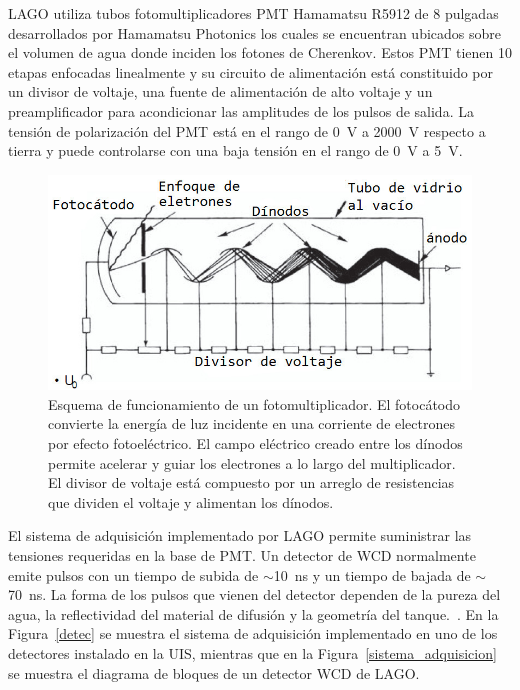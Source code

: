 LAGO utiliza tubos fotomultiplicadores PMT Hamamatsu R5912 de 8 pulgadas desarrollados por Hamamatsu Photonics los cuales se encuentran ubicados sobre el volumen de agua donde inciden los fotones de Cherenkov. 
Estos PMT tienen 10 etapas enfocadas linealmente y su circuito de alimentación está constituido por un divisor de voltaje, una fuente de alimentación de alto voltaje y un preamplificador para acondicionar las amplitudes de los pulsos de salida.
La tensión de polarización del PMT está en el rango de 0~V a 2000~V respecto a tierra y puede controlarse con una baja tensión en el rango de 0~V a 5~V.

\begin{figure}[H]
\includegraphics[scale=0.35]{Figs/pmtll.jpeg} 
\centering
\caption[Esquema de funcionamiento de un fotomultiplicador]{Esquema de funcionamiento de un fotomultiplicador.
El fotocátodo convierte la energía de luz incidente en una corriente de electrones por efecto fotoeléctrico.
El campo eléctrico creado entre los dínodos permite acelerar y guiar los electrones a lo largo del multiplicador.
El divisor de voltaje está compuesto por un arreglo de resistencias que dividen el voltaje y alimentan los dínodos.~\citep{hernandez2018procedimiento}}
\label{foto}
\end{figure}

El sistema de adquisición implementado por LAGO permite suministrar las tensiones requeridas en la base de PMT.
Un detector de WCD normalmente emite pulsos con un tiempo de subida de $\sim$10~ns y un tiempo de bajada de $\sim$70~ns.
La forma de los pulsos que vienen del detector dependen de la pureza del agua, la reflectividad del material de difusión y la geometría del tanque.~\citep{haro2016data}.
En la Figura~\ref{detec} se muestra el sistema de adquisición implementado en uno de los detectores instalado en la UIS, mientras que en la Figura~\ref{sistema_adquisicion} se muestra el diagrama de bloques de un detector WCD de LAGO.

